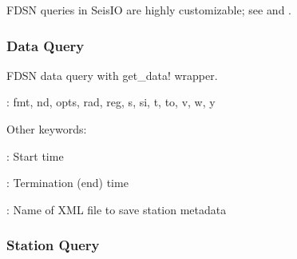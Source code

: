 \documentclass[letterpaper,11pt,english]{sphinxmanual}
\begin{document}
FDSN queries in SeisIO are highly customizable; see {\hyperref[\detokenize{src/Appendices/keywords:dkw}]{}} and {\hyperref[\detokenize{src/Appendices/web_syntax:cid}]{}}.


\subsubsection{Data Query}
\label{\detokenize{src/Web/webclients:data-query}}

\begin{fulllineitems}
\end{fulllineitems}



\begin{fulllineitems}
\end{fulllineitems}


FDSN data query with get\_data! wrapper.

\begin{DUlineblock}{0em}
\item[] {\hyperref[\detokenize{src/Appendices/keywords:dkw}]{}}: fmt, nd, opts, rad, reg, s, si, t, to, v, w, y
\item[] Other keywords:
\item[] : Start time
\item[] : Termination (end) time
\item[] : Name of XML file to save station metadata
\end{DUlineblock}


\subsubsection{Station Query}
\label{\detokenize{src/Web/webclients:station-query}}

\begin{fulllineitems}
\end{fulllineitems}



\begin{fulllineitems}
\end{fulllineitems}
\end{document}
